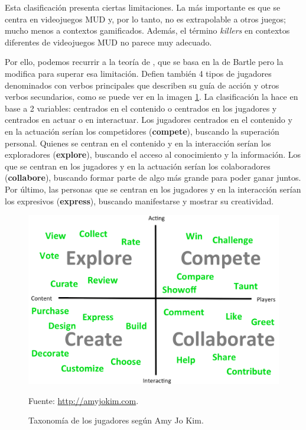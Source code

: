 Esta clasificación presenta ciertas limitaciones. 
%
La más importante es que se centra en videojuegos \gls{MUD} y, por lo tanto, no es extrapolable a otros juegos; mucho menos a contextos gamificados.
%
Además, el término \textit{killers} en contextos diferentes de videojuegos \gls{MUD} no parece muy adecuado.


%
Por ello, podemos recurrir a la teoría de  \cite{AmyJoKim}, que se basa en la de Bartle pero la modifica para superar esa limitación.
%
Defien también 4 tipos de jugadores denominados con verbos principales que describen su guía de acción y otros verbos secundarios, como se puede ver en la imagen \ref{fig::AmyJoKim}.
%
La clasificación la hace en base a 2 variables: centrados en el contenido o centrados en los jugadores y centrados en actuar o en interactuar.
%
Los jugadores centrados en el contenido y en la actuación serían los competidores (\textbf{compete}), buscando la superación personal.
%
Quienes se centran en el contenido y en la interacción serían los exploradores (\textbf{explore}), buscando el acceso al conocimiento y la información.
%
Los que se centran en los jugadores y en la actuación serían los colaboradores (\textbf{collabore}), buscando formar parte de algo más grande para poder ganar juntos.
%
Por último, las personas que se centran en los jugadores y en la interacción serían los expresivos (\textbf{express}), buscando manifestarse y mostrar su creatividad.

\begin{figure}[hbt]
\begin{center}
\includegraphics[scale=0.25]{img/AmyJoKim.png}
\caption{Taxonomía de los jugadores según Amy Jo Kim.}
\label{fig::AmyJoKim}
\vspace{-0.25cm}
\small{Fuente: \url{http://amyjokim.com}.}
\end{center}
\end{figure}


